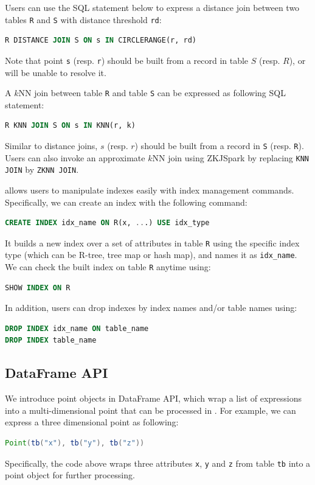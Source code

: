 \begin{appendix}
 Users can use the SQL statement below to
express a distance join between two tables \texttt{R} and \texttt{S} with
distance threshold \texttt{rd}:
\begin{lstlisting}[language=SQL]
R DISTANCE JOIN S ON s IN CIRCLERANGE(r, rd)
\end{lstlisting}
Note that point \texttt{s} (resp. \texttt{r}) should be built from a record in
table $S$ (resp. $R$), or \name will be unable to resolve it.

 A $k$NN join between table \texttt{R} and table \texttt{S}
can be expressed as following SQL statement:
\begin{lstlisting}[language=SQL]
R KNN JOIN S ON s IN KNN(r, k)
\end{lstlisting}
Similar to distance joins, $s$ (resp. $r$) should be built from a record in \texttt{S}
(resp. \texttt{R}). Users can also invoke an approximate $k$NN join using ZKJSpark
by replacing \texttt{KNN JOIN} by \texttt{ZKNN JOIN}.

 \name allows users to manipulate indexes
easily with index management commands. Specifically, we can create
an index with the following command:
\begin{lstlisting}[language=SQL]
CREATE INDEX idx_name ON R(x, ...) USE idx_type
\end{lstlisting}
It builds a new index over a set of attributes in table \texttt{R} using the specific index
type (which can be R-tree, tree map or hash map), and names it as \texttt{idx\_name}.
We can check the built index on table \texttt{R} anytime using:
\begin{lstlisting}[language=SQL]
SHOW INDEX ON R
\end{lstlisting}
In addition, users can drop indexes by index names and/or table names using:
\begin{lstlisting}[language=SQL]
DROP INDEX idx_name ON table_name
DROP INDEX table_name
\end{lstlisting}

\subsection{DataFrame API}
\lstset{basicstyle=\scriptsize\ttfamily}
 We introduce point objects in DataFrame API, which wrap a list
of expressions into a multi-dimensional point that can be processed in \name. For
example, we can express a three dimensional point as following:
\begin{lstlisting}[language=java]
Point(tb("x"), tb("y"), tb("z"))
\end{lstlisting}
Specifically, the code above wraps three attributes \texttt{x}, \texttt{y} and \texttt{z}
from table \texttt{tb} into a point object for further processing.


\end{appendix}
